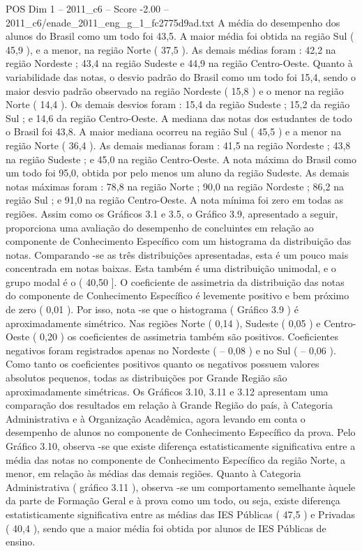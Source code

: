 \begin{textsample}{POS Dim 1 – 2011\_c6 – Score -2.00 – 2011\_c6/enade\_2011\_eng\_g\_1\_fc2775d9ad.txt}
A média do desempenho dos alunos do Brasil como um todo foi 43,5.
A maior média foi obtida na região Sul ( 45,9 ), e a menor, na região Norte ( 37,5 ).
As demais médias foram : 42,2 na região Nordeste ; 43,4 na região Sudeste e 44,9 na região Centro-Oeste.
Quanto à variabilidade das notas, o desvio padrão do Brasil como um todo foi 15,4, sendo o maior desvio padrão observado na região Nordeste ( 15,8 ) e o menor na região Norte ( 14,4 ).
Os demais desvios foram : 15,4 da região Sudeste ; 15,2 da região Sul ; e 14,6 da região Centro-Oeste.
A mediana das notas dos estudantes de todo o Brasil foi 43,8.
A maior mediana ocorreu na região Sul ( 45,5 ) e a menor na região Norte ( 36,4 ).
As demais medianas foram : 41,5 na região Nordeste ; 43,8 na região Sudeste ; e 45,0 na região Centro-Oeste.
A nota máxima do Brasil como um todo foi 95,0, obtida por pelo menos um aluno da região Sudeste.
As demais notas máximas foram : 78,8 na região Norte ; 90,0 na região Nordeste ; 86,2 na região Sul ; e 91,0 na região Centro-Oeste.
A nota mínima foi zero em todas as regiões.
Assim como os Gráficos 3.1 e 3.5, o Gráfico 3.9, apresentado a seguir, proporciona uma avaliação do desempenho de concluintes em relação ao componente de Conhecimento Específico com um histograma da distribuição das notas.
Comparando -se as três distribuições apresentadas, esta é um pouco mais concentrada em notas baixas.
Esta também é uma distribuição unimodal, e o grupo modal é o ( 40,50 ].
O coeficiente de assimetria da distribuição das notas do componente de Conhecimento Específico é levemente positivo e bem próximo de zero ( 0,01 ).
Por isso, nota -se que o histograma ( Gráfico 3.9 ) é aproximadamente simétrico.
Nas regiões Norte ( 0,14 ), Sudeste ( 0,05 ) e Centro-Oeste ( 0,20 ) os coeficientes de assimetria também são positivos.
Coeficientes negativos foram registrados apenas no Nordeste ( – 0,08 ) e no Sul ( – 0,06 ).
Como tanto os coeficientes positivos quanto os negativos possuem valores absolutos pequenos, todas as distribuições por Grande Região são aproximadamente simétricas.
Os Gráficos 3.10, 3.11 e 3.12 apresentam uma comparação dos resultados em relação à Grande Região do país, à Categoria Administrativa e à Organização Acadêmica, agora levando em conta o desempenho de alunos no componente de Conhecimento Específico da prova.
Pelo Gráfico 3.10, observa -se que existe diferença estatisticamente significativa entre a média das notas no componente de Conhecimento Específico da região Norte, a menor, em relação às médias das demais regiões.
Quanto à Categoria Administrativa ( gráfico 3.11 ), observa -se um comportamento semelhante àquele da parte de Formação Geral e à prova como um todo, ou seja, existe diferença estatisticamente significativa entre as médias das IES Públicas ( 47,5 ) e Privadas ( 40,4 ), sendo que a maior média foi obtida por alunos de IES Públicas de ensino.

\end{textsample}
